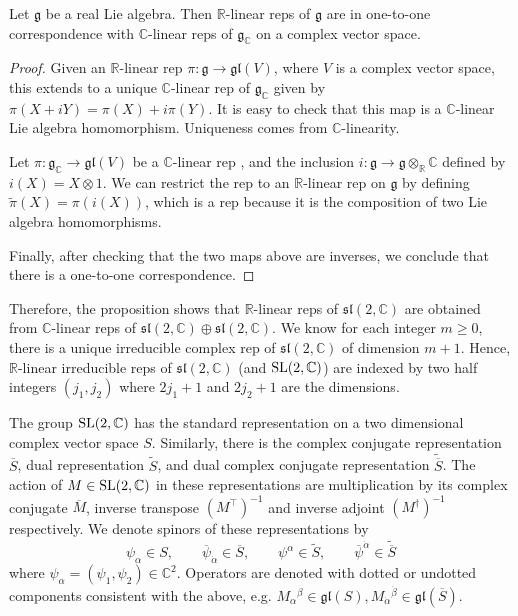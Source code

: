 \begin{prop}
	Let $\mathfrak{g}$ be a real Lie algebra. Then
	$\mathbb{R}$-linear reps of $\mathfrak{g}$ are in one-to-one
	correspondence with $\mathbb{C}$-linear reps of  $\mathfrak{g}_{\mathbb{C}}$
	on a complex vector space. 
\end{prop}
\begin{proof}
	Given an $\mathbb{R}$-linear rep $\pi : \mathfrak{g} \to \mathfrak{gl}(V)$,
	where  $V$ is a complex vector space, this extends to a unique
	$\mathbb{C}$-linear rep of $\mathfrak{g}_{\mathbb{C}}$ given by 
	$\pi(X+iY) = \pi(X) + i\pi(Y)$. It is easy to check that this map is  a
	$\mathbb{C}$-linear Lie algebra homomorphism. Uniqueness comes from
	$\mathbb{C}$-linearity.

	Let $\pi : \mathfrak{g}_{\mathbb{C}} \to\mathfrak{gl}(V)$ be a 
	$\mathbb{C}$-linear rep , and the inclusion $i : \mathfrak{g} \to
	\mathfrak{g}\otimes_{\mathbb{R}}\mathbb{C}$ defined by $i(X) = X\otimes 1$. We can restrict
	the rep to an $\mathbb{R}$-linear rep on $\mathfrak{g}$ by defining
	$\widetilde{\pi}(X) = \pi(i(X))$, which is a rep because it is the composition of
	two Lie algebra homomorphisms. 

	Finally, after checking that the two maps above are inverses, we conclude
	that there is a one-to-one correspondence. 
\end{proof}

Therefore, the proposition shows that $\mathbb{R}$-linear reps of
$\mathfrak{sl}(2,\mathbb{C})$ are obtained from $\mathbb{C}$-linear reps of
$\mathfrak{sl}(2,\mathbb{C})\oplus \mathfrak{sl}(2,\mathbb{C})$.
We know for each integer $m\geq 0$, there is a unique irreducible complex
rep of $\mathfrak{sl}(2,\mathbb{C})$ of dimension $m+1$.\cite{hall} Hence,
$\mathbb{R}$-linear irreducible reps  of $\mathfrak{sl}(2,\mathbb{C})$ (and
$\operatorname{SL}(2,\mathbb{C})$)
are indexed by two half integers $(j_1,j_2)$ where $2j_1+1$ and $2j_2+1$ are the
dimensions.  

The group $\operatorname{SL}(2,\mathbb{C})$ has the standard representation on a two dimensional
complex vector space $S$. Similarly, there is the complex conjugate
representation $\overline{S}$, dual representation $\widetilde{S}$, and dual
complex conjugate representation $\widetilde{\overline{S}}$. 
The action of $M\in \operatorname{SL}(2,\mathbb{C})$ in these representations are
multiplication by its complex conjugate $\overline{M}$, inverse transpose
$(M^\intercal)^{-1}$ and inverse adjoint $(M^{\dagger})^{-1}$ respectively.
We denote spinors of these representations by 
\[
\psi_\alpha \in S, \qquad \overline{\psi}_{\dot{\alpha}}\in \overline{S}, \qquad
\psi^\alpha \in \widetilde{S}, \qquad \overline{\psi}^{\dot{\alpha}}\in \widetilde{\overline{S}}
\] 
where $\psi_\alpha=(\psi_1,\psi_2)\in \mathbb{C}^2$.
Operators are denoted with dotted or undotted components consistent with the
above, e.g. $M_{\alpha}{}^\beta \in \mathfrak{gl}(S),
M_{\dot{\alpha}}{}^{\dot{\beta}} \in \mathfrak{gl}(\overline{S})$. 

